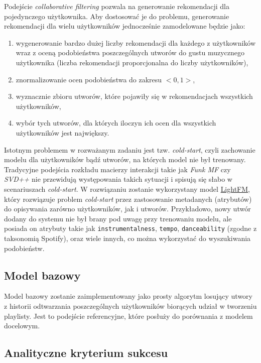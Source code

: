\documentclass[10pt,a4paper]{article}
\begin{document}
Podejście \textit{collaborative filtering} pozwala na generowanie rekomendacji dla pojedynczego użytkownika. Aby dostosować je do problemu, generowanie rekomendacji dla wielu użytkowników jednocześnie zamodelowane będzie jako:
\begin{enumerate}

\item wygenerowanie bardzo dużej liczby rekomendacji dla każdego z użytkowników wraz z oceną podobieństwa poszczególnych utworów do gustu muzycznego użytkownika (liczba rekomendacji proporcjonalna do liczby użytkowników),
\item znormalizowanie ocen podobieństwa do zakresu $<0, 1>$,
\item wyznacznie zbioru utworów, które pojawiły się w rekomendacjach wszystkich użytkowników,
\item wybór tych utworów, dla których iloczyn ich ocen dla wszystkich użytkowników jest największy.

\end{enumerate}

Istotnym problemem w rozważanym zadaniu jest tzw. \textit{cold-start}, czyli zachowanie modelu dla użytkowników bądź utworów, na których model nie był trenowany. Tradycyjne podejścia rozkładu macierzy interakcji takie jak \textit{Funk MF} czy \textit{SVD++} nie przewidują występowania takich sytuacji i spisują się słabo w scenariuszach \textit{cold-start}. W rozwiązaniu zostanie wykorzystany model \href{https://arxiv.org/pdf/1507.08439.pdf}{LightFM}, który rozwiązuje problem \textit{cold-start} przez zastosowanie metadanych (atrybutów) do opisywania zarówno użytkowników, jak i utworów. Przykładowo, nowy utwór dodany do systemu nie był brany pod uwagę przy trenowaniu modelu, ale posiada on atrybuty takie jak \texttt{instrumentalness}, \texttt{tempo}, \texttt{danceability} (zgodne z taksonomią Spotify), oraz wiele innych, co można wykorzystać do wyszukiwania podobieństw. 

\subsection*{Model bazowy}

Model bazowy zostanie zaimplementowany jako prosty algorytm losujący utwory z historii odtwarzania poszczególnych użytkowników biorących udział w tworzeniu playlisty. Jest to podejście referencyjne, które posłuży do porównania z modelem docelowym.

\subsection*{Analityczne kryterium sukcesu}
\end{document}
